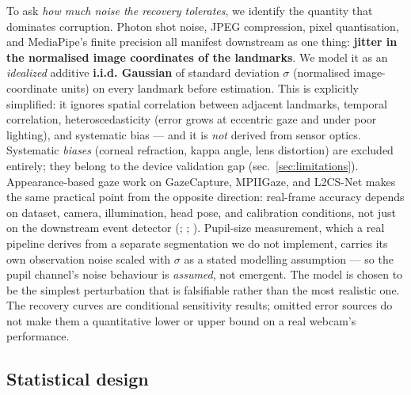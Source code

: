 \documentclass[
]{article}
\begin{document}
To ask \emph{how much noise the recovery tolerates}, we identify the
quantity that dominates corruption. Photon shot noise, JPEG compression,
pixel quantisation, and MediaPipe's finite precision all manifest
downstream as one thing: \textbf{jitter in the normalised image
coordinates of the landmarks}. We model it as an \emph{idealized}
additive \textbf{i.i.d. Gaussian} of standard deviation \(\sigma\)
(normalised image-coordinate units) on every landmark before estimation.
This is explicitly simplified: it ignores spatial correlation between
adjacent landmarks, temporal correlation, heteroscedasticity (error
grows at eccentric gaze and under poor lighting), and systematic bias
--- and it is \emph{not} derived from sensor optics. Systematic
\emph{biases} (corneal refraction, kappa angle, lens distortion) are
excluded entirely; they belong to the device validation gap
(sec.~\ref{sec:limitations}). Appearance-based gaze work on GazeCapture,
MPIIGaze, and L2CS-Net makes the same practical point from the opposite
direction: real-frame accuracy depends on dataset, camera, illumination,
head pose, and calibration conditions, not just on the downstream event
detector (;
;
). Pupil-size
measurement, which a real pipeline derives from a separate segmentation
we do not implement, carries its own observation noise scaled with
\(\sigma\) as a stated modelling assumption --- so the pupil channel's
noise behaviour is \emph{assumed}, not emergent. The model is chosen to
be the simplest perturbation that is falsifiable rather than the most
realistic one. The recovery curves are conditional sensitivity results;
omitted error sources do not make them a quantitative lower or upper
bound on a real webcam's performance.

\subsection{Statistical design}\label{statistical-design}
\end{document}

